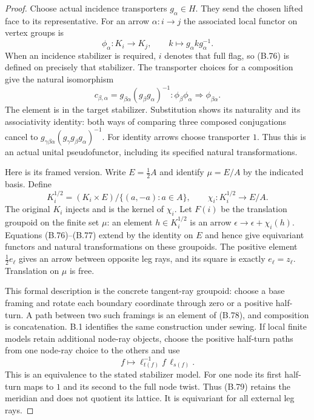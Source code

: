 \begin{proof}
Choose actual incidence transporters $g_\alpha\in H$.
They send the chosen lifted face to its representative.
For an arrow $\alpha:i\to j$ the associated local functor
on vertex groups is
\[
 \phi_\alpha:K_i\longrightarrow K_j,\qquad
 k\longmapsto g_\alpha k g_\alpha^{-1}.            \tag{B.76}
\]
When an incidence stabilizer is required, $i$ denotes
that full flag, so (B.76) is defined on precisely that
stabilizer.  The transporter choices for a composition
give the natural isomorphism
\[
 c_{\beta,\alpha}
   =g_{\beta\alpha}(g_\beta g_\alpha)^{-1}:
 \phi_\beta\phi_\alpha\Longrightarrow\phi_{\beta\alpha}.
                                                               \tag{B.77}
\]
The element is in the target stabilizer.  Substitution
shows its naturality and its associativity identity:
both ways of comparing three composed conjugations
cancel to $g_{\gamma\beta\alpha}
(g_\gamma g_\beta g_\alpha)^{-1}$.
For identity arrows choose transporter $1$.
Thus this is an actual unital pseudofunctor, including
its specified natural transformations.

Here is its framed version.  Write $E=\tfrac12A$ and
identify $\mu=E/A$ by the indicated basis.  Define
\[
 K_i^{1/2}=(K_i\times E)/
       \{(a,-a):a\in A\},\qquad
 \chi_i:K_i^{1/2}\longrightarrow E/A.             \tag{B.78}
\]
The original $K_i$ injects and is the kernel of $\chi_i$.
Let $F(i)$ be the translation groupoid on the finite
set $\mu$: an element $h\in K_i^{1/2}$ is an arrow
$\epsilon\to\epsilon+\chi_i(h)$.  Equations (B.76)--(B.77)
extend by the identity on $E$ and hence give equivariant
functors and natural transformations on these groupoids.
The positive element $\frac12e_\ell$ gives an arrow
between opposite leg rays, and its square is exactly
$e_\ell=z_\ell$.  Translation on $\mu$ is free.

This formal description is the concrete tangent-ray
groupoid: choose a base framing and rotate each boundary
coordinate through zero or a positive half-turn.  A
path between two such framings is an element of (B.78),
and composition is concatenation.  B.1 identifies the
same construction under sewing.  If local finite models
retain additional node-ray objects, choose the positive
half-turn paths from one node-ray choice to the others
and use
\[
 f\longmapsto \ell_{t(f)}^{-1}f\,\ell_{s(f)}.       \tag{B.79}
\]
This is an equivalence to the stated stabilizer model.
For one node its first half-turn maps to $1$ and its
second to the full node twist.  Thus (B.79) retains
the meridian and does not quotient its lattice.
It is equivariant for all external leg rays.


\end{proof}
